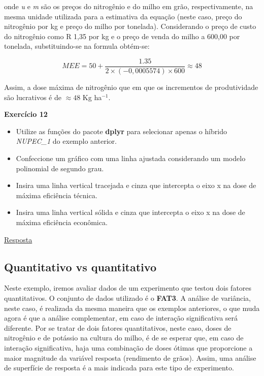 \documentclass[
]{book}
\begin{document}
onde \emph{u} e \emph{m} são os preços do nitrogênio e do milho em grão, respectivamente, na mesma unidade utilizada para a estimativa da equação (neste caso, preço do nitrogênio por kg e preço do milho por tonelada). Considerando o preço de custo do nitrogênio como R 1,35 por kg e o preço de venda do milho a 600,00 por tonelada, substituindo-se na formula obtém-se:

\[
MEE = 50 + \frac{{1.35}}{{2 \times (-0,0005574) \times 600}} \approx 48
\]

Assim, a dose máxima de nitrogênio que em que os incrementos de produtividade são lucrativos é de \(\approx 48\) Kg ha\(^{-1}\).

\begin{tarefa}
\textbf{Exercício 12}

\begin{itemize}
\item
  Utilize as funções do pacote \textbf{dplyr} para selecionar apenas o híbrido \emph{NUPEC\_1} do exemplo anterior.
\item
  Confeccione um gráfico com uma linha ajustada considerando um modelo polinomial de segundo grau.
\item
  Insira uma linha vertical tracejada e cinza que intercepta o eixo x na dose de máxima eficiência técnica.
\item
  Insira uma linha vertical sólida e cinza que intercepta o eixo x na dose de máxima eficiência econômica.
\end{itemize}
\end{tarefa}

\protect\hyperlink{exerc12}{Resposta}

\hypertarget{quantitativo-vs-quantitativo}{%
\subsection{Quantitativo vs quantitativo}\label{quantitativo-vs-quantitativo}}

Neste exemplo, iremos avaliar dados de um experimento que testou dois fatores quantitativos. O conjunto de dados utilizado é o \textbf{FAT3}. A análise de variância, neste caso, é realizada da mesma maneira que os exemplos anteriores, o que muda agora é que a análise complementar, em caso de interação significativa será diferente. Por se tratar de dois fatores quantitativos, neste caso, doses de nitrogênio e de potássio na cultura do milho, é de se esperar que, em caso de interação  significativa, haja uma combinação de doses ótimas que proporcione a maior magnitude da variável resposta (rendimento de grãos). Assim, uma análise de superfície de resposta é a mais indicada para este tipo de experimento.
\end{document}
